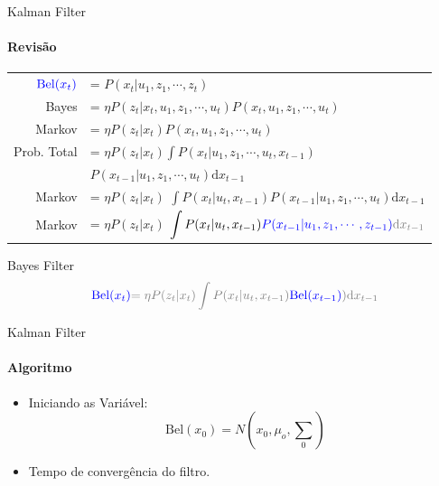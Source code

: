 \documentclass[aspectratio=169]{beamer}
\begin{document}
\begin{frame}{Kalman Filter}
    \framesubtitle{Revisão}
    \setlength\extrarowheight{5pt}
        \begin{tabular}{r l}
            $\color{blue}{\text{Bel}}(x_t)$ & = $P(x_t| u_1, z_1,  \cdots, z_t)$ \\
            Bayes & = $\eta P(z_t|x_t,  u_1, z_1,  \cdots,  u_t)P(x_t, u_1, z_1, \cdots, u_t)$ \\
            Markov & = $\eta P(z_t|x_t)P(x_t, u_1, z_1, \cdots, u_t)$ \\
            Prob. Total & = $\eta P(z_t|x_t)\displaystyle\int P(x_t| u_1, z_1, \cdots, u_t,x_{t-1})$ \\
                        &  \quad \quad \quad $P(x_{t-1}| u_1, z_1, \cdots, u_t)\text{d}x_{t-1}$\\
            Markov & = $\eta P(z_t|x_t)$ $\displaystyle\int P(x_t| u_t,x_{t-1})P(x_{t-1}| u_1, z_1, \cdots, u_t)\text{d}x_{t-1}$ \\
            Markov & = $\eta P(z_t|x_t)$ $\displaystyle\int P(x_t| u_t,x_{t-1})\color{blue}{P(x_{t-1}| u_1, z_1, \cdots, z_{t-1}})\color{gray}{\text{d}x_{t-1}}$ \\
        \end{tabular}   
    \begin{block}{Bayes Filter}
        \begin{equation*}
            \color{blue}{\text{Bel}}(x_t)  \color{gray}{=\eta P(z_t|x_t)\displaystyle\int P(x_t| u_t,x_{t-1})}\color{blue}{\color{blue}{\text{Bel}}(x_{t-1})}\color{gray}{)\text{d}x_{t-1}}
        \end{equation*}
    \end{block}
\end{frame}


\begin{frame}[c]{Kalman Filter}
    \framesubtitle{Algoritmo}
    \begin{itemize}
        \item Iniciando as Variável:
        \begin{equation}
            \text{Bel}(x_0) = N\left(x_0, \mu_o, {\textstyle\sum} _0\right)
        \end{equation}
        \item Tempo de convergência do filtro.
    \end{itemize}
\end{frame}
\end{document}
